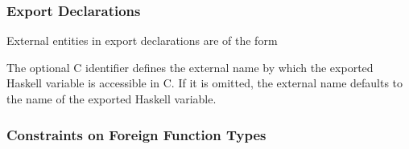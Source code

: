 \documentclass[a4paper,twoside]{article}
\begin{document}
\subsubsection{Export Declarations}

External entities in  export declarations are of the form
%
\begin{grammar}
\end{grammar}
%
The optional C identifier  defines the external name by which the
exported Haskell variable is accessible in C.  If it is omitted, the external
name defaults to the name of the exported Haskell variable.

\subsubsection{Constraints on Foreign Function Types}
\end{document}
